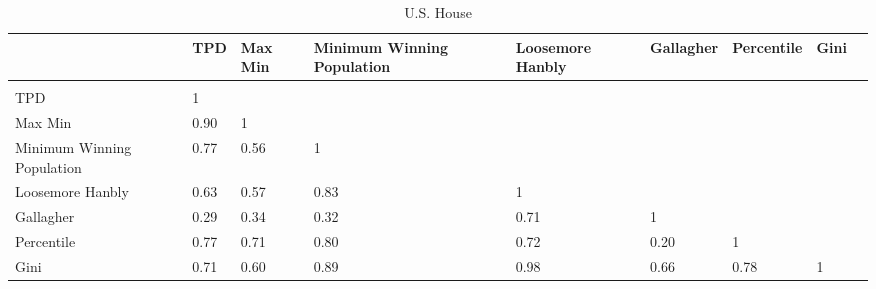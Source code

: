 
\begin{landscape}

\begin{table}[!htbp] \centering 
  \caption{U.S. House} 
  \label{tab:cor_house} 
\begin{tabular}{C{2.5cm}p{1.75cm}p{1.75cm}p{1.75cm}p{1.75cm}p{1.75cm}p{1.75cm}p{1.75cm}p{1.75cm}}
{} & {TPD} & {Max Min} & {Minimum Winning Population} & {Loosemore Hanbly} & {Gallagher} & {Percentile} & {Gini} \\ 
\hline \\[-1.8ex] 
{TPD} & 1 &  &  &  &  &  &  \\ 
{Max Min} & 0.90 & 1 &  &  &  &  &  \\ 
{Minimum Winning Population} & 0.77 & 0.56 & 1 &  &  &  &  \\ 
{Loosemore Hanbly} & 0.63 & 0.57 & 0.83 & 1 &  &  &  \\ 
{Gallagher} & 0.29 & 0.34 & 0.32 & 0.71 & 1 &  &  \\ 
{Percentile} & 0.77 & 0.71 & 0.80 & 0.72 & 0.20 & 1 &  \\ 
{Gini} & 0.71 & 0.60 & 0.89 & 0.98 & 0.66 & 0.78 & 1 \\ 
\end{tabular}
\tabnotes{}
\end{table}

\end{landscape}
 
